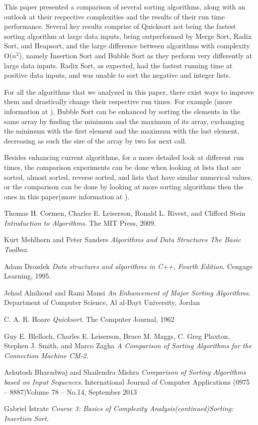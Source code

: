\documentclass{article}
\numberwithin{figure}{section}
\begin{document}
This paper presented a comparison of several sorting algorithms, along with an outlook at their respective complexities and the results of their run time performance. Several key results comprise of Quicksort not being the fastest sorting algorithm at large data inputs, being outperformed by Merge Sort, Radix Sort, and Heapsort, and the large difference between algorithms with complexity O(\(n^2\)), namely Insertion Sort and Bubble Sort as they perform very differently at large data inputs. Radix Sort, as expected, had the fastest running time at positive data inputs, and was unable to sort the negative and integer lists.

For all the algorithms that we analyzed in this paper, there exist ways to improve them and drastically change their respective run times. For example (more information at \cite{Jehad}), Bubble Sort can be enhanced by sorting the elements in the same array by finding the minimum and the maximum of its array, exchanging the minimum with the first element and the maximum with the last element, decreasing as such the size of the array by two for next call.

Besides enhancing current algorithms, for a more detailed look at different run times, the comparison experiments can be done when looking at lists that are sorted, almost sorted, reverse sorted, and lists that have similar numerical values, or the comparison can be done by looking at more sorting algorithms then the ones in this paper(more information at \cite{Thomas}\cite{Kurt}\cite{Adam}).


\pagebreak

\begin{thebibliography}{9}

Thomas H. Cormen, Charles E. Leiserson, Ronald L. Rivest, and Clifford Stein
\textit{Introduction to Algorithms}. 
The MIT Press, 2009.

Kurt Mehlhorn and Peter Sanders
\textit{Algorithms and Data Structures The Basic Toolbox}. 

Adam Drozdek
\textit{Data structures and algorithms in C++, Fourth Edition}.
Cengage Learning, 1995.

Jehad Alnihoud and Rami Mansi 
\textit{An Enhancement of Major Sorting Algorithms}. 
Department of Computer Science, Al al-Bayt University, Jordan

C. A. R. Hoare
\textit{Quicksort}. 
The Computer Journal, 1962

Guy E. Blelloch, Charles E. Leiserson, Bruce M. Maggs, C. Greg Plaxton, Stephen J. Smith, and Marco Zagha
\textit{A Comparison of Sorting Algorithms for the Connection Machine CM-2}. 

Ashutosh Bharadwaj and Shailendra Mishra
\textit{Comparison of Sorting Algorithms based on Input Sequences}.
International Journal of Computer Applications (0975 – 8887)Volume 78 – No.14, September 2013

Gabriel Istrate
\textit{Course 3: Basics of Complexity Analysis(continued)Sorting: Insertion Sort}.

\end{thebibliography}
\end{document}
